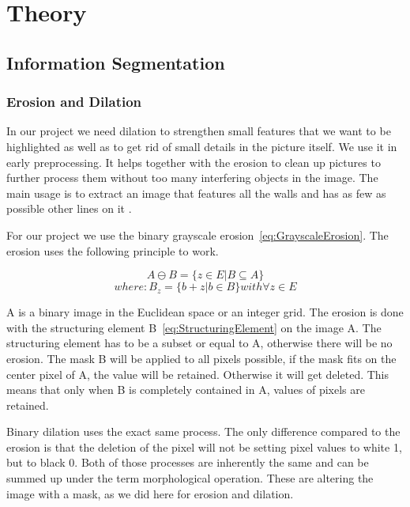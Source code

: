 \section{Theory}
\subsection{Information Segmentation}
\subsubsection{Erosion and Dilation}
\label{subsubsec:Erosion and Dilation}
In our project we need dilation to strengthen small features that we want to be highlighted as well as to get rid of small details in the picture itself. We use it in early preprocessing. It helps together with the erosion to clean up pictures to further process them without too many interfering objects in the image. The main usage is to extract an image that features all the walls and has as few as possible other lines on it \citep{burger_burge_2016}.

For our project we use the binary grayscale erosion~\eqref{eq:GrayscaleErosion}.
The erosion uses the following principle to work.


\begin{equation}\label{eq:GrayscaleErosion}A \ominus B = \{ z\in E | B \subseteq A \}\end{equation}  
\begin{equation}\label{eq:StructuringElement}where: B_{z} = \{b+z | b \in B\} with \forall z \in E \end{equation}

A is a binary image in the Euclidean space or an integer grid. The erosion is done with the structuring element B~\eqref{eq:StructuringElement} on the image A. The structuring element has to be a subset or equal to A, otherwise there will be no erosion. The mask B will be applied to all pixels possible, if the mask fits on the center pixel of A, the value will be retained. Otherwise it will get deleted. This means that only when B is completely contained in A, values of pixels are retained.

Binary dilation uses the exact same process. The only difference compared to the erosion is that the deletion of the pixel will not be setting pixel values to white 1, but to black 0. Both of those processes are inherently the same and can be summed up under the term morphological operation. These are altering the image with a mask, as we did here for erosion and dilation.

